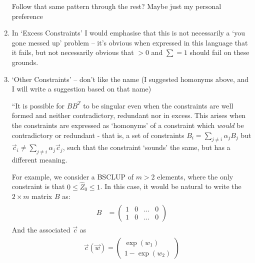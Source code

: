 \documentclass[]{article}
\begin{document}
\begin{enumerate}
		Follow that same pattern through the rest? Maybe just my personal preference

		\item In `Excess Constraints' I would emphasise that this is not necessarily a `you gone messed up' problem -- it's obvious when expressed in this language that it fails, but not necessarily obvious that $>0$ and $\sum = 1$ should fail on these grounds. 
		
		\item `Other Constraints' -- don't like the name (I suggested homonyms above, and I will write a suggestion based on that name)
		
		``It is possible for $BB^T$ to be singular even when the constraints are well formed and neither contradictory, redundant nor in excess. This arises when the constraints are expressed as `homonyms' of a constraint which \textit{would} be contradictory or redundant - that is, a set of constraints $B_i = \sum_{j\neq i} \alpha_j B_j$ but $\vec{c}_i \neq \sum_{j\neq i} \alpha_j \vec{c}_j$, such that the constraint `sounds' the same, but has a different meaning.
		
		For example, we consider a BSCLUP of $m > 2$ elements, where the only constraint is that $0 \leq \hat{Z}_0 \leq 1$. In this case, it would be natural to write the $2\times m$ matrix $B$ as:
		\begin{align}
			\begin{split}
				B &= \begin{pmatrix}
					1 & 0 & \hdots & 0
					\\
					1 & 0 & \hdots & 0
				\end{pmatrix}
			\end{split}
		\end{align}
		And the associated $\vec{c}$ as
		\begin{align}
			\begin{split}
				\vec{c}(\vec{w}) = \begin{pmatrix}
					\exp(w_1)
					\\
					1 - \exp(w_2)
				\end{pmatrix}
			\end{split}
		\end{align}
	

\end{enumerate}
\end{document}
